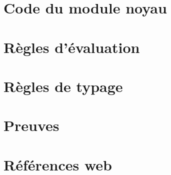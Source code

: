 \documentclass[a4paper,11pt]{memoir}
\begin{document}
\appendix
\renewcommand{\appendixpagename}{Annexes}
\renewcommand{\appendixtocname}{\appendixpagename}
\appendixpage*

\chapter{Code du module noyau}

\label{cha:code-noyau}


\chapter{Règles d'évaluation}



\chapter{Règles de typage}



\chapter{Preuves}



\backmatter


\listoftodos

\clearpage

\listoffigures

\clearpage

\renewcommand{\listtheoremname}{Liste des définitions}
\listoftheorems[ignoreall,show={definition}]

\renewcommand{\listtheoremname}{Liste des théorèmes et propriétés}
\listoftheorems[ignoreall,show={theorem,lemma}]

\chapter{Références web}

\insertlinks



\end{document}
